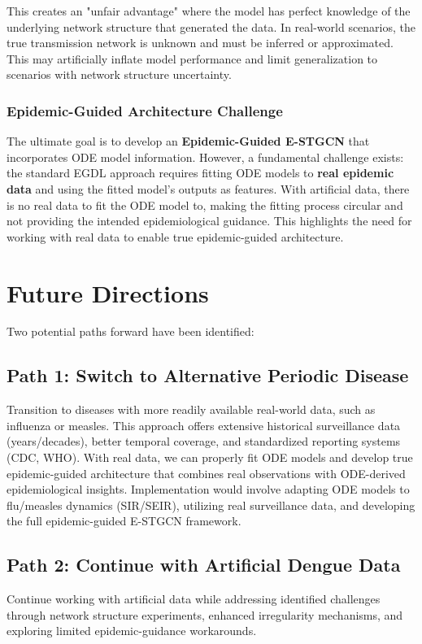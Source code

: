 \documentclass[12pt,a4paper]{article}
\begin{document}
This creates an "unfair advantage" where the model has perfect knowledge of the underlying network structure that generated the data. In real-world scenarios, the true transmission network is unknown and must be inferred or approximated. This may artificially inflate model performance and limit generalization to scenarios with network structure uncertainty.

\subsubsection{Epidemic-Guided Architecture Challenge}
The ultimate goal is to develop an \textbf{Epidemic-Guided E-STGCN} that incorporates ODE model information. However, a fundamental challenge exists: the standard EGDL approach requires fitting ODE models to \textbf{real epidemic data} and using the fitted model's outputs as features. With artificial data, there is no real data to fit the ODE model to, making the fitting process circular and not providing the intended epidemiological guidance. This highlights the need for working with real data to enable true epidemic-guided architecture.

\section{Future Directions}

Two potential paths forward have been identified:

\subsection{Path 1: Switch to Alternative Periodic Disease}
Transition to diseases with more readily available real-world data, such as influenza or measles. This approach offers extensive historical surveillance data (years/decades), better temporal coverage, and standardized reporting systems (CDC, WHO). With real data, we can properly fit ODE models and develop true epidemic-guided architecture that combines real observations with ODE-derived epidemiological insights. Implementation would involve adapting ODE models to flu/measles dynamics (SIR/SEIR), utilizing real surveillance data, and developing the full epidemic-guided E-STGCN framework.

\subsection{Path 2: Continue with Artificial Dengue Data}
Continue working with artificial data while addressing identified challenges through network structure experiments, enhanced irregularity mechanisms, and exploring limited epidemic-guidance workarounds.
\end{document}
